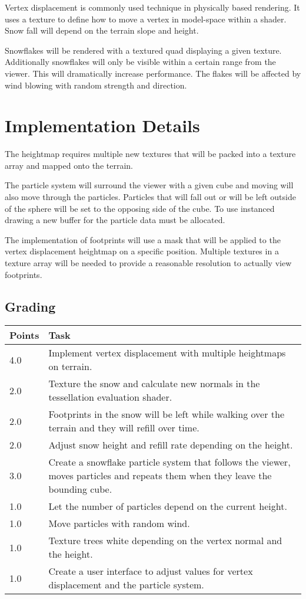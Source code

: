 \documentclass[paper=a4]{article}
\begin{document}
	
	Vertex displacement is commonly used technique in physically based rendering. It uses a texture to define how to move a vertex in model-space within a shader. Snow fall will depend on the terrain slope and height. \cite{Ohlsson2004}
	
	Snowflakes will be rendered with a textured quad displaying a given texture. Additionally snowflakes will only be visible within a certain range from the viewer. This will dramatically increase performance. The flakes will be affected by wind blowing with random strength and direction. \cite{Wang2006}
	
	\section{Implementation Details}
	
	The heightmap requires multiple new textures that will be packed into a texture array and mapped onto the terrain.
	
	The particle system will surround the viewer with a given cube and moving will also move through the particles. Particles that will fall out or will be left outside of the sphere will be set to the opposing side of the cube. To use instanced drawing a new buffer for the particle data must be allocated.
	
	The implementation of footprints will use a mask that will be applied to the vertex displacement heightmap on a specific position. Multiple textures in a texture array will be needed to provide a reasonable resolution to actually view footprints. 
	
	\subsection{Grading}
	\renewcommand{\arraystretch}{1.5} %
	\begin{tabular}{ l l}
		\hline
		Points & Task \\
		\hline
		4.0 & Implement vertex displacement with multiple heightmaps on terrain. \\
		2.0 & Texture the snow and calculate new normals in the tessellation evaluation shader.\\
		2.0 & Footprints in the snow will be left while walking over the terrain and they will refill over time.\\
		2.0 & Adjust snow height and refill rate depending on the height.\\
		3.0 & Create a snowflake particle system that follows the viewer, moves particles and repeats them when they leave the bounding cube. \\
		1.0 & Let the number of particles depend on the current height. \\
		1.0 & Move particles with random wind. \\
		1.0 & Texture trees white depending on the vertex normal and the height. \\
		1.0 & Create a user interface to adjust values for vertex displacement and the particle system. 
		
		
	\end{tabular}

{}

	
\end{document}
